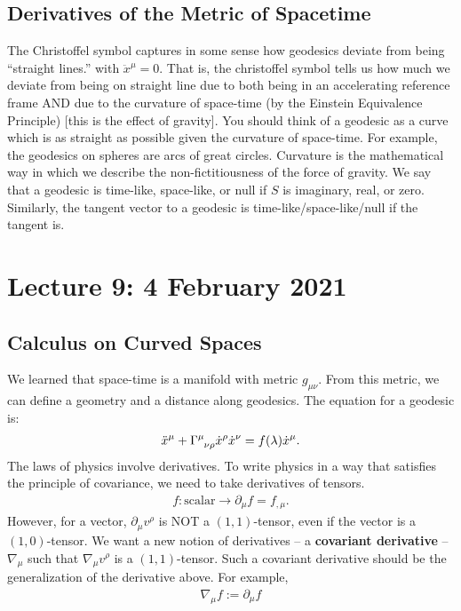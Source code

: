 \documentclass[11pt]{article}
\theoremstyle{definition}
\begin{document}
\subsection{Derivatives of the Metric of Spacetime}
The Christoffel symbol captures in some sense how geodesics deviate from being ``straight lines.'' with \( \ddot{x}^\mu = 0 \). That is, the christoffel symbol tells us how much we deviate from being on straight line due to both being in an accelerating reference frame AND due to the curvature of space-time (by the Einstein Equivalence Principle) [this is the effect of gravity]. You should think of a geodesic as a curve which is as straight as possible given the curvature of space-time. For example, the geodesics on spheres are arcs of great circles. Curvature is the mathematical way in which we describe the non-fictitiousness of the force of gravity.
\newline
\newline
We say that a geodesic is time-like, space-like, or null if \( S \) is imaginary, real, or zero. Similarly, the tangent vector to a geodesic is time-like/space-like/null if the tangent is. 

\section{Lecture 9: 4 February 2021}
\subsection{Calculus on Curved Spaces}
We learned that space-time is a manifold with metric \( g_{\mu \nu} \). From this metric, we can define a geometry and a distance along geodesics. The equation for a geodesic is: 
\begin{align*}
	\ddot{x}^\mu + \tensor{\Gamma}{^\mu_{\nu \rho}} \dot{x}^\rho \dot{x}^\nu = f(\lambda) \dot{x}^\mu.
\end{align*}
The laws of physics involve derivatives. To write physics in a way that satisfies the principle of covariance, we need to take derivatives of tensors. 
\begin{align*}
	f: \text{scalar} \rightarrow \partial_\mu f = f_{, \mu}.
\end{align*}
However, for a vector, \( \partial_\mu v^\rho \) is NOT a \( (1,1)\)-tensor, even if the vector is a \( (1,0) \)-tensor. We want a new notion of derivatives -- a \textbf{covariant derivative} -- \( \nabla_\mu \) such that \( \nabla_\mu v^\rho \) is a \((1,1)\)-tensor. Such a covariant derivative should be the generalization of the derivative above. For example, 
\begin{align*}
	\nabla_\mu f := \partial_\mu f
\end{align*}
\end{document}
